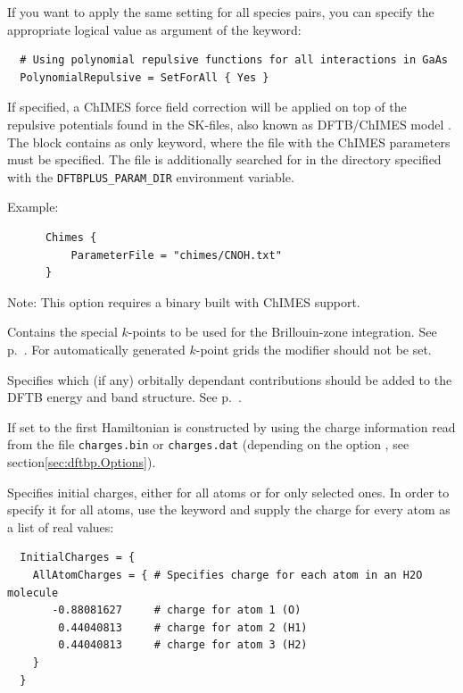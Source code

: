 \begin{description}
  If you want to apply the same setting for all species pairs, you can
  specify the appropriate logical value as argument of the
   keyword:

\begin{verbatim}
  # Using polynomial repulsive functions for all interactions in GaAs
  PolynomialRepulsive = SetForAll { Yes }
\end{verbatim}

\item[\is{Chimes}] If specified, a ChIMES force field correction will be applied
  on top of the repulsive potentials found in the SK-files, also known as
  DFTB/ChIMES model \cite{goldman-jctc-2018}. The  block contains
   as only keyword, where the file with the ChIMES parameters
  must be specified. The file is additionally searched for in the directory
  specified with the \texttt{DFTBPLUS\_PARAM\_DIR} environment variable.

  Example:
  \begin{verbatim}
      Chimes {
          ParameterFile = "chimes/CNOH.txt"
      }
  \end{verbatim}

  Note: This option requires a {\dftbp} binary built with ChIMES support.

\item[\is{KPointsAndWeights}] Contains the
  special $k$-points to be used for the Bril\-louin-zone integration.
  See p.~. For automatically generated
  $k$-point grids the modifier should not be set.

\item[\is{OrbitalPotential}] Specifies which (if any) orbitally
  dependant contributions should be added to the DFTB energy and
  band structure. See p.~.


\item[\is{ReadInitialCharges}] If set to  the first Hamiltonian is
  constructed by using the charge information read from the file
  \verb|charges.bin| or \verb|charges.dat| (depending on the option
  , see section\ref{sec:dftbp.Options}).

\item[\is{InitialCharges}] Specifies initial charges, either for all atoms or
  for only selected ones. In order to specify it for all atoms, use the keyword
   and supply the charge for every atom as a list of real
  values:
\begin{verbatim}
  InitialCharges = {
    AllAtomCharges = { # Specifies charge for each atom in an H2O molecule
       -0.88081627     # charge for atom 1 (O)
        0.44040813     # charge for atom 2 (H1)
        0.44040813     # charge for atom 3 (H2)
    }
  }
\end{verbatim}


\end{description}
